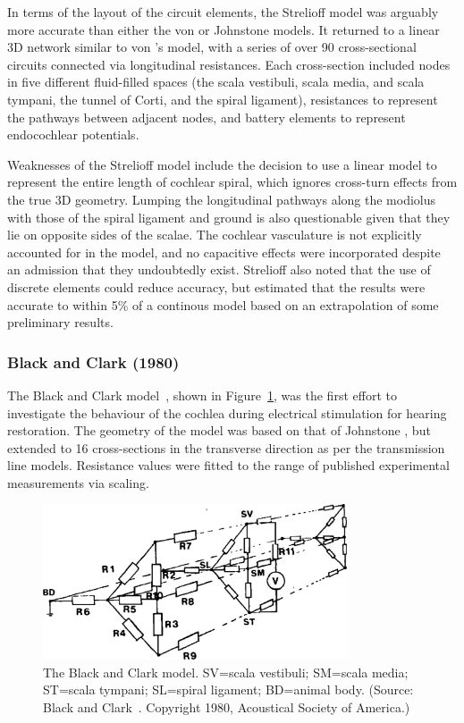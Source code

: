 In terms of the layout of the circuit elements, the Strelioff model was arguably
more accurate than either the von \bekesy{} or Johnstone models. It returned to
a linear 3D network similar to von \bekesy's model, with a series of over 90
cross-sectional circuits connected via longitudinal resistances. Each
cross-section included nodes in five different fluid-filled spaces (the scala
vestibuli, scala media, and scala tympani, the tunnel of Corti, and the spiral
ligament), resistances to represent the pathways between adjacent nodes, and
battery elements to represent endocochlear potentials.

Weaknesses of the Strelioff model include the decision to use a linear model to
represent the entire length of cochlear spiral, which ignores cross-turn effects
from the true 3D geometry. Lumping the longitudinal pathways along the modiolus
with those of the spiral ligament and ground is also questionable given that
they lie on opposite sides of the scalae. The cochlear vasculature is not
explicitly accounted for in the model, and no capacitive effects were
incorporated despite an admission that they undoubtedly exist. Strelioff also
noted that the use of discrete elements could reduce accuracy, but estimated
that the results were accurate to within 5\% of a continous model based on an
extrapolation of some preliminary results.

\subsubsection{Black and Clark (1980)}

The Black and Clark model~\cite{black1980,black1983}, shown in
Figure~\ref{fig:model_black}, was the first effort to investigate the behaviour
of the cochlea during electrical stimulation for hearing restoration. The
geometry of the model was based on that of Johnstone \etal, but extended to 16
cross-sections in the transverse direction as per the transmission line models.
Resistance values were fitted to the range of published experimental
measurements via scaling.

\begin{figure}
	\centering
	\includegraphics[width=9cm]{Background/black_clark}
	\caption[The Black and Clark model]{The Black and Clark model. SV=scala
	vestibuli; SM=scala media; ST=scala tympani; SL=spiral ligament; BD=animal
	body. (Source: Black and Clark~\cite{black1980}. Copyright \textcopyright{}
	1980, Acoustical Society of America.)}
	\label{fig:model_black}
\end{figure}


